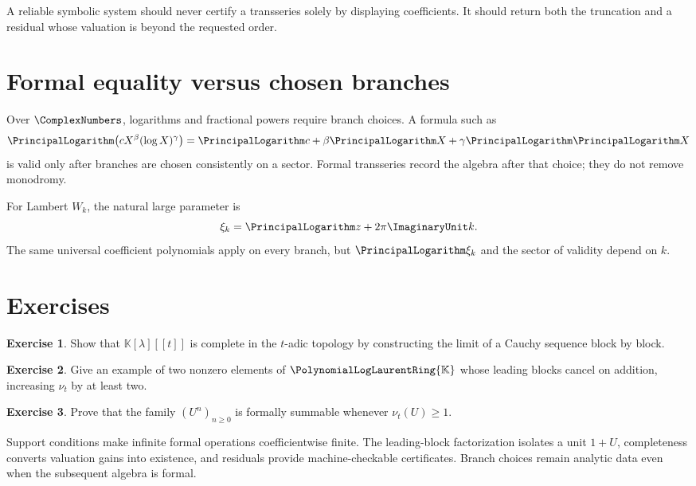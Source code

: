 \documentclass[11pt,openany]{book}
\theoremstyle{definition}
\newtheorem{exercise}{Exercise}[chapter]
\theoremstyle{plain}
\theoremstyle{remark}
\newcommand{\K}{\mathbb{K}}
\newcommand{\Plog}{\PolynomialLogLaurentRing{\K}}
\newcommand{\val}{\nu}
\begin{document}
\begin{algorithmicbox}
A reliable symbolic system should never certify a transseries solely by displaying coefficients. It should return both the truncation and a residual whose valuation is beyond the requested order.
\end{algorithmicbox}

\section{Formal equality versus chosen branches}
Over \(\ComplexNumbers\), logarithms and fractional powers require branch choices. A formula such as
\[
 \PrincipalLogarithm\bigl(cX^\beta(\log X)^\gamma\bigr)
 =\PrincipalLogarithm c+\beta\PrincipalLogarithm X+\gamma\PrincipalLogarithm\PrincipalLogarithm X
\]
is valid only after branches are chosen consistently on a sector. Formal transseries record the algebra after that choice; they do not remove monodromy.

For Lambert \(W_k\), the natural large parameter is
\[
 \xi_k=\PrincipalLogarithm z+2\pi\ImaginaryUnit k.
\]
The same universal coefficient polynomials apply on every branch, but \(\PrincipalLogarithm\xi_k\) and the sector of validity depend on \(k\).

\section{Exercises}
\begin{exercise}
Show that \(\K[\lambda][[t]]\) is complete in the \(t\)-adic topology by constructing the limit of a Cauchy sequence block by block.
\end{exercise}
\begin{exercise}
Give an example of two nonzero elements of \(\Plog\) whose leading blocks cancel on addition, increasing \(\val_t\) by at least two.
\end{exercise}
\begin{exercise}
Prove that the family \((U^n)_{n\ge0}\) is formally summable whenever \(\val_t(U)\ge1\).
\end{exercise}

\begin{summarybox}
Support conditions make infinite formal operations coefficientwise finite. The leading-block factorization isolates a unit \(1+U\), completeness converts valuation gains into existence, and residuals provide machine-checkable certificates. Branch choices remain analytic data even when the subsequent algebra is formal.
\end{summarybox}
\end{document}
